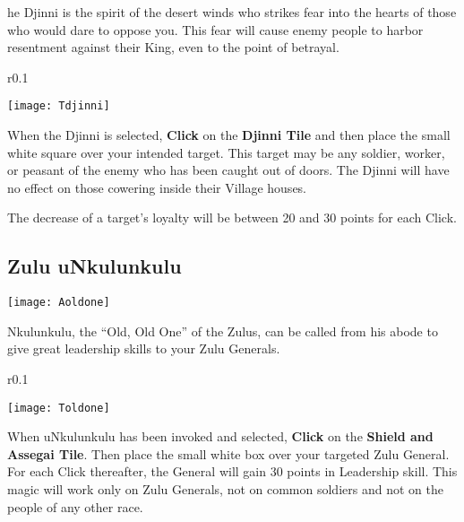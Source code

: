 he Djinni is the spirit of the desert winds who strikes fear into the hearts of those who would dare to oppose you. This fear will cause enemy people to harbor resentment against their King, even to the point of betrayal.

\begin{wrapfigure}{r}{0.1\textwidth}
    \vspace{-20pt}
    \begin{center}
        \texttt{[image: Tdjinni]}
    \end{center}
    \vspace{-20pt}
\end{wrapfigure}

When the Djinni is selected, \textbf{Click} on the \textbf{Djinni Tile} and then place the small white square over your intended target. This target may be any soldier, worker, or peasant of the enemy who has been caught out of doors. The Djinni will have no effect on those cowering inside their Village houses.

The decrease of a target's loyalty will be between 20 and 30 points for each Click.

\subsection{Zulu uNkulunkulu}


\begin{center}
    \texttt{[image: Aoldone]}
\end{center}


Nkulunkulu, the “Old, Old One” of the Zulus, can be called from his abode to give great leadership skills to your Zulu Generals.

\begin{wrapfigure}{r}{0.1\textwidth}
    \vspace{-20pt}
    \begin{center}
        \texttt{[image: Toldone]}
    \end{center}
    \vspace{-20pt}
\end{wrapfigure}

When uNkulunkulu has been invoked and selected, \textbf{Click} on the \textbf{Shield and Assegai Tile}. Then place the small white box over your targeted Zulu General. For each Click thereafter, the General will gain 30 points in Leadership skill. This magic will work only on Zulu Generals, not on common soldiers and not on the people of any other race.

